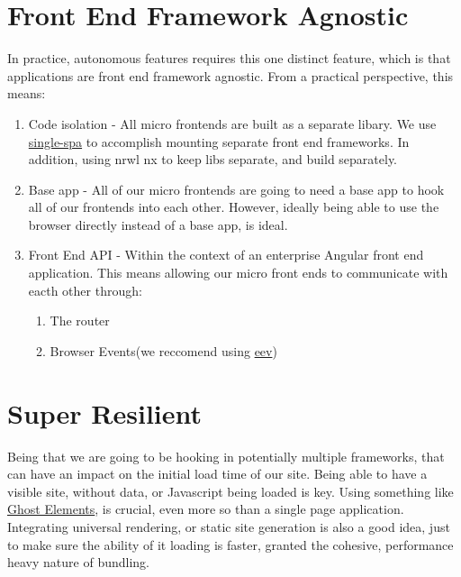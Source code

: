 \section{Front End Framework Agnostic}
In practice, autonomous features requires this one distinct feature, which is that applications are front end framework agnostic. From a practical perspective, this means:

\begin{enumerate}
  \item Code isolation - All micro frontends are built as a separate libary. We use \href{github.com/CanopyTax/single-spa}{single-spa} to accomplish mounting separate front end frameworks. In addition, using nrwl nx to keep libs separate, and build separately.
  \item Base app - All of our micro frontends are going to need a base app to hook all of our frontends into each other. However, ideally being able to use the browser directly instead of a base app, is ideal.
  \item Front End API - Within the context of an enterprise Angular front end application. This means allowing our micro front ends to communicate with eacth other through: 
  \begin{enumerate}
    \item The router
    \item Browser Events(we reccomend using \href{github.com/chrisdavies/eev}{eev})
  \end{enumerate}
\end{enumerate} 

\section{Super Resilient}
Being that we are going to be hooking in potentially multiple frameworks, that can have an impact on the initial load time of our site. Being able to have a visible site, without data, or Javascript being loaded is key. Using something like \href{https://medium.com/angular-in-depth/https-medium-com-thomasburleson-animated-ghosts-bfc045a51fba}{Ghost Elements}, is crucial, even more so than a single page application. Integrating universal rendering, or static site generation is also a good idea, just to make sure the ability of it loading is faster, granted the cohesive, performance heavy nature of bundling.

